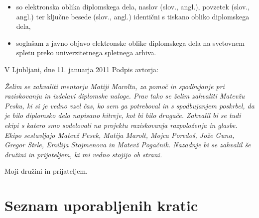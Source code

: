 \documentclass[a4paper, 12pt]{book}
\newcommand{\clearemptydoublepage}{\newpage{\pagestyle{empty}\cleardoublepage}}
\begin{document}
{\begin{itemize}
	\item	so elektronska oblika diplomskega dela, naslov (slov., angl.), povzetek (slov., angl.) ter ključne besede (slov., angl.) identični s tiskano obliko diplomskega dela,
	\item soglašam z javno objavo elektronske oblike diplomskega dela na svetovnem spletu preko univerzitetnega spletnega arhiva.	
\end{itemize}

\vspace{1cm}
\noindent V Ljubljani, dne 11. januarja 2011 \hfill Podpis avtorja:

\clearemptydoublepage

\thispagestyle{empty}\mbox{}\vfill\null\it%
Želim se zahvaliti mentorju Matiji Maroltu, za pomoč in spodbujanje pri raziskovanju in izdelavi diplomske naloge. Prav tako se želim zahvaliti Matevžu Pesku, ki si je vedno vzel čas, ko sem ga potreboval in s spodbujanjem poskrbel, da je bilo diplomsko delo napisano hitreje, kot bi bilo drugače. Zahvalil bi se tudi ekipi s katero smo sodelovali na projektu raziskovanja razpoloženja in glasbe. Ekipo sestavljajo Matevž Pesek, Matija Marolt, Mojca Poredoš, Jože Guna, Gregor Strle, Emilija Stojmenova in Matevž Pogačnik. Nazadnje bi se zahvalil še družini in prijateljem, ki mi vedno stojijo ob strani. 
\rm\normalfont

\clearemptydoublepage

\thispagestyle{empty}\mbox{}{\textheight}\mbox{}\hfill\begin{minipage}{0.55\textwidth}%
Moji družini in prijateljem.
\normalfont\end{minipage}

\clearemptydoublepage

\def\thepage{}%
\tableofcontents{}


\clearemptydoublepage


\chapter*{Seznam uporabljenih kratic}

}
\end{document}
